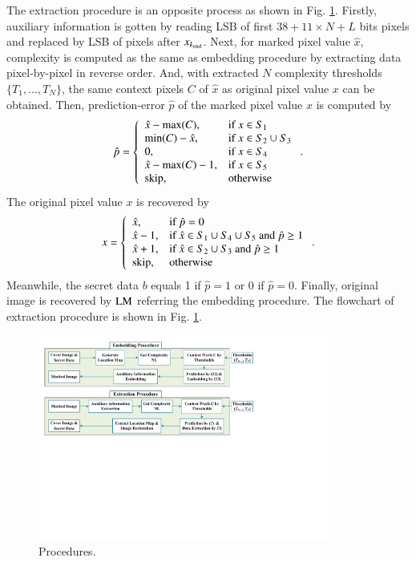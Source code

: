 \documentclass[review,3p,10pt,sort&compress]{elsarticle}
\begin{document}
The extraction procedure is an opposite process as shown in Fig. \ref{Fig.Procedures}. Firstly, auxiliary information is gotten by reading LSB of first $38 + 11 \times N + L$ bits pixels and replaced by LSB of pixels after $x_{k_{\rm end}}$. Next, for marked pixel value $\hat{x}$, complexity is computed as the same as embedding procedure by extracting data pixel-by-pixel in reverse order. And, with extracted $N$ complexity thresholds $\{T_1, ..., T_N\}$, the same context pixels $C$ of $\hat{x}$ as original pixel value $x$ can be obtained. Then, prediction-error $\hat{p}$ of the marked pixel value $\hat{x}$ is computed by
\begin{equation}\label{eq:EPPVODPE}
\hat{p} = \left\{\begin{array}{ll}
\hat{x} - \max(C),      & \text{if } x \in S_1  \\
\min(C) - \hat{x},      & \text{if } x \in S_2 \cup S_3 \\
0,                      & \text{if } x \in S_4 \\
\hat{x} - \max(C) - 1,  & \text{if } x \in S_5  \\
{\rm skip},             & \text{otherwise}
\end{array}\right..
\end{equation}
The original pixel value $x$ is recovered by
\begin{equation}\label{eq:EPPVOdMPixel}
x = \left\{\begin{array}{ll}
\hat{x},        & \text{if } \hat{p} = 0 \\
\hat{x} - 1,    & \text{if } \hat{x} \in S_1 \cup S_4 \cup S_5 \text{ and } \hat{p} \geq 1 \\
\hat{x} + 1,    & \text{if } \hat{x} \in S_2 \cup S_3 \text{ and } \hat{p} \geq 1 \\
{\rm skip},         & \text{otherwise}
\end{array}\right..
\end{equation}
Meanwhile, the secret data $b$ equals 1 if $\hat{p}=1$ or $0$ if $\hat{p} = 0$. Finally, original image is recovered by ${\rm LM}$ referring the embedding procedure. The flowchart of extraction procedure is shown in Fig. \ref{Fig.Procedures}.

\begin{figure}
\centering
\includegraphics[width=0.85\textwidth]{figures/Procedures.pdf}
\centering
\caption{Procedures.}
\label{Fig.Procedures}
\end{figure}
\end{document}
